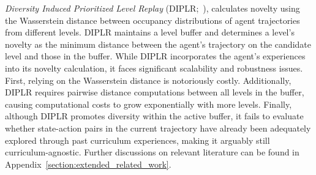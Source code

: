 {\em Diversity Induced Prioritized Level Replay} (DIPLR;~\cite{li2023effective}), calculates novelty using the Wasserstein distance between occupancy distributions of agent trajectories from different levels. DIPLR maintains a level buffer and determines a level's novelty as the minimum distance between the agent's trajectory on the candidate level and those in the buffer. While DIPLR incorporates the agent’s experiences into its novelty calculation, it faces significant scalability and robustness issues. First, relying on the Wasserstein distance is notoriously costly. Additionally, DIPLR requires pairwise distance computations between all levels in the buffer, causing computational costs to grow exponentially with more levels. Finally, although DIPLR promotes diversity within the active buffer, it fails to evaluate whether state-action pairs in the current trajectory have already been adequately explored through past curriculum experiences, making it arguably still curriculum-agnostic. Further discussions on relevant literature can be found in Appendix~\ref{section:extended_related_work}.